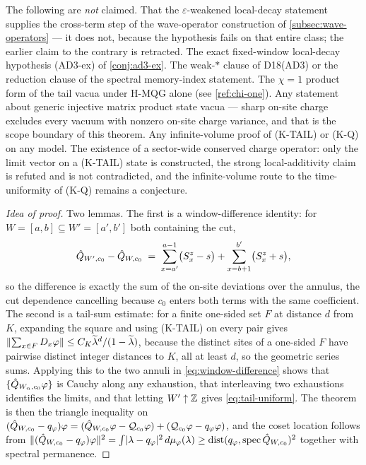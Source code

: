 \begin{scope}
\label{scope:eps-theorem}
The following are \emph{not} claimed. That the $\varepsilon$-weakened
local-decay statement supplies the cross-term step of the wave-operator
construction of \cref{subsec:wave-operators} --- it does not, because the
hypothesis fails on that entire class; the earlier claim to the contrary is
retracted. The exact fixed-window local-decay hypothesis (AD3-ex) of
\cref{conj:ad3-ex}. The weak-$*$ clause of D18(AD3) or the reduction clause of
the spectral memory-index statement. The $\chi=1$ product form of the tail
vacua under H-MQG alone (see \cref{ref:chi-one}). Any statement about generic
injective matrix product state vacua --- sharp on-site charge excludes every
vacuum with nonzero on-site charge variance, and that is the scope boundary of
this theorem. Any infinite-volume proof of (K-TAIL) or (K-Q) on any model.
The existence of a sector-wide conserved charge operator: only the limit
vector on a (K-TAIL) state is constructed, the strong local-additivity claim
is refuted and is not contradicted, and the infinite-volume route to the
time-uniformity of (K-Q) remains a conjecture.
\end{scope}

\begin{proof}[Idea of proof]
Two lemmas. The first is a window-difference identity: for
$W=[a,b]\subseteq W'=[a',b']$ both containing the cut,
\begin{equation}
  \hat{Q}_{W',c_0}-\hat{Q}_{W,c_0}
  \;=\;\sum_{x=a'}^{a-1}\bigl(S^z_x-s\bigr)
      +\sum_{x=b+1}^{b'}\bigl(S^z_x+s\bigr),
  \label{eq:window-difference}
\end{equation}
so the difference is exactly the sum of the on-site deviations over the
annulus, the cut dependence cancelling because $c_0$ enters both terms with the
same coefficient. The second is a tail-sum estimate: for a finite one-sided set
$F$ at distance $d$ from $K$, expanding the square and using (K-TAIL) on every
pair gives
$\lVert \sum_{x\in F}D_x\varphi\rVert\le C_K\widetilde{\lambda}^{d}/(1-\widetilde{\lambda})$, because the
distinct sites of a one-sided $F$ have pairwise distinct integer distances to
$K$, all at least $d$, so the geometric series sums. Applying this to the two
annuli in \eqref{eq:window-difference} shows that
$\{\hat{Q}_{W_n,c_0}\varphi\}$ is Cauchy along any exhaustion, that interleaving
two exhaustions identifies the limits, and that letting $W'\uparrow\mathbb{Z}$ gives
\eqref{eq:tail-uniform}. The theorem is then the triangle inequality on
$(\hat{Q}_{W,c_0}-q_\varphi)\varphi
=(\hat{Q}_{W,c_0}\varphi-\mathcal{Q}_{c_0}\varphi)+(\mathcal{Q}_{c_0}\varphi-q_\varphi\varphi)$,
and the coset location follows from
$\lVert (\hat{Q}_{W,c_0}-q_\varphi)\varphi\rVert^2=\int\lvert \lambda-q_\varphi\rvert^2\,
d\mu_\varphi(\lambda)\ge\operatorname{dist}(q_\varphi,\operatorname{spec}\hat{Q}_{W,c_0})^2$ together with
spectral permanence.
\end{proof}

